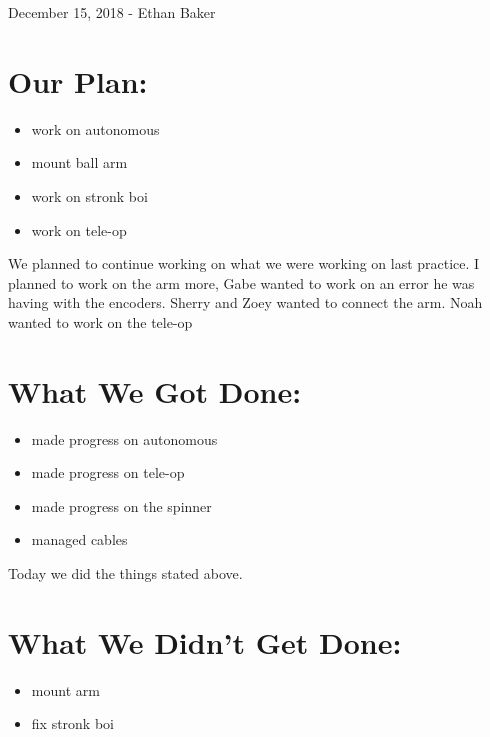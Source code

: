 \documentclass[12pt]{article}
\begin{document}
December 15, 2018 - Ethan Baker

\section{Our Plan:} %
\begin{itemize}
	\item work on autonomous
\item mount ball arm
\item work on stronk boi
\item work on tele-op
\end{itemize}

We planned to continue working on what we were working on last practice. I planned to work on the arm more, Gabe wanted to work on an error he was having with the encoders. Sherry and Zoey wanted to connect the arm. Noah wanted to work on the tele-op

\section{What We Got Done:} %
\begin{itemize}
	\item made progress on autonomous
\item made progress on tele-op
\item made progress on the spinner
\item managed cables

\end{itemize}

Today we did the things stated above.

\section{What We Didn't Get Done:} %
\begin{itemize}
	\item mount arm
\item fix stronk boi
\end{itemize}
\end{document}
